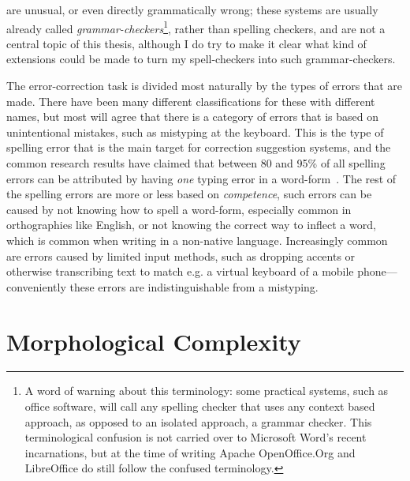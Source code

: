 \documentclass[officiallayout]{unihelcompling}
\begin{document}
are unusual, or even directly grammatically wrong; these systems are usually
already called \emph{\glspl{grammar-checker}}\footnote{A word of warning about this
    terminology: some practical systems, such as office software, will call any
    spelling checker that uses any context based approach, as opposed to an
    isolated approach, a grammar checker. This terminological confusion is not
    carried over to Microsoft Word's recent incarnations, but at the time of
writing Apache OpenOffice.Org and LibreOffice do still follow the confused
terminology.}, rather than spelling checkers, and are not a
central topic of this thesis, although I do try to make it clear what kind of
extensions could be made to turn my spell-checkers into such grammar-checkers.

The error-correction task is divided most naturally by the types of errors that
are made. There have been many different classifications for these with
different names, but most will agree that there is a category of errors that is
based on unintentional mistakes, such as mistyping at the keyboard. This is the
type of spelling error that is the main target for correction suggestion
systems, and the common research results have claimed that between 80 and 95\%
of all spelling errors can be attributed by having \emph{one} typing error in a
word-form~\citep{kukich1992techniques}. The rest of the spelling errors are
more or less based on \emph{competence}, such errors can be caused by not
knowing how to spell a word-form, especially common in orthographies like
English, or not knowing the correct way to inflect a word, which is common when
writing in a non-native language. Increasingly common are errors caused by
limited input methods, such as dropping accents or otherwise transcribing text
to match e.g.  a virtual keyboard of a mobile phone---conveniently these errors
are indistinguishable from a mistyping.



\section{Morphological Complexity}
\label{sec:morphological-complexity}
\end{document}
